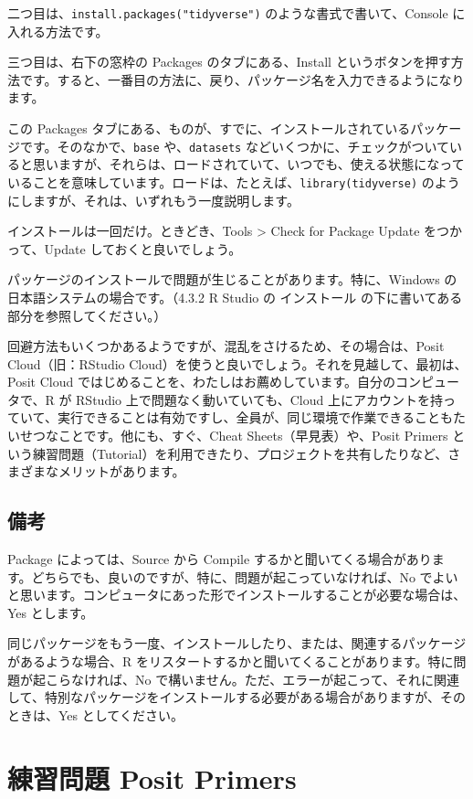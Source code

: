 \documentclass[
  xelatex, ja=standard]{bxjsbook}
\theoremstyle{definition}
\theoremstyle{definition}
\theoremstyle{definition}
\theoremstyle{definition}
\theoremstyle{remark}
\begin{document}
二つ目は、\texttt{install.packages("tidyverse")} のような書式で書いて、Console に入れる方法です。

三つ目は、右下の窓枠の Packages のタブにある、Install というボタンを押す方法です。すると、一番目の方法に、戻り、パッケージ名を入力できるようになります。

この Packages タブにある、ものが、すでに、インストールされているパッケージです。そのなかで、\texttt{base} や、\texttt{datasets} などいくつかに、チェックがついていると思いますが、それらは、ロードされていて、いつでも、使える状態になっていることを意味しています。ロードは、たとえば、\texttt{library(tidyverse)} のようにしますが、それは、いずれもう一度説明します。

インストールは一回だけ。ときどき、Tools \textgreater{} Check for Package Update をつかって、Update しておくと良いでしょう。

パッケージのインストールで問題が生じることがあります。特に、Windows の日本語システムの場合です。（4.3.2 R Studio の インストール の下に書いてある部分を参照してください。）

回避方法もいくつかあるようですが、混乱をさけるため、その場合は、Posit Cloud（旧：RStudio Cloud）を使うと良いでしょう。それを見越して、最初は、Posit Cloud ではじめることを、わたしはお薦めしています。自分のコンピュータで、R が RStudio 上で問題なく動いていても、Cloud 上にアカウントを持っていて、実行できることは有効ですし、全員が、同じ環境で作業できることもたいせつなことです。他にも、すぐ、Cheat Sheets（早見表）や、Posit Primers という練習問題（Tutorial）を利用できたり、プロジェクトを共有したりなど、さまざまなメリットがあります。

\hypertarget{ux5099ux8003-1}{%
\subsection{備考}\label{ux5099ux8003-1}}

Package によっては、Source から Compile するかと聞いてくる場合があります。どちらでも、良いのですが、特に、問題が起こっていなければ、No でよいと思います。コンピュータにあった形でインストールすることが必要な場合は、Yes とします。

同じパッケージをもう一度、インストールしたり、または、関連するパッケージがあるような場合、R をリスタートするかと聞いてくることがあります。特に問題が起こらなければ、No で構いません。ただ、エラーが起こって、それに関連して、特別なパッケージをインストールする必要がある場合がありますが、そのときは、Yes としてください。

\hypertarget{ux7df4ux7fd2ux554fux984c-posit-primers}{%
\section{練習問題 Posit Primers}\label{ux7df4ux7fd2ux554fux984c-posit-primers}}
\end{document}
